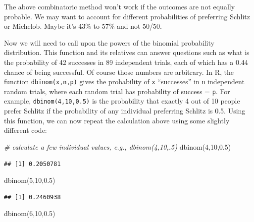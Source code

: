 \documentclass[
  openany]{book}
\newenvironment{Shaded}{\begin{snugshade}}{\end{snugshade}}
\newcommand{\CommentTok}[1]{\textcolor[rgb]{0.56,0.35,0.01}{\textit{#1}}}
\newcommand{\DecValTok}[1]{\textcolor[rgb]{0.00,0.00,0.81}{#1}}
\newcommand{\FloatTok}[1]{\textcolor[rgb]{0.00,0.00,0.81}{#1}}
\newcommand{\FunctionTok}[1]{\textcolor[rgb]{0.00,0.00,0.00}{#1}}
\newcommand{\NormalTok}[1]{#1}
\begin{document}
The above combinatoric method won't work if the outcomes are not equally probable. We may want to account for different probabilities of preferring Schlitz or Michelob. Maybe it's 43\% to 57\% and not 50/50.

Now we will need to call upon the powers of the binomial probability distribution. This function and its relatives can answer questions such as what is the probability of 42 successes in 89 independent trials, each of which has a 0.44 chance of being successful. Of course those numbers are arbitrary. In R, the function \texttt{dbinom(x,n,p)} gives the probability of \texttt{x} ``successes'' in \texttt{n} independent random trials, where each random trial has probability of success = \texttt{p}. For example, \texttt{dbinom(4,10,0.5)} is the probability that exactly 4 out of 10 people prefer Schlitz if the probability of any individual preferring Schlitz is 0.5. Using this function, we can now repeat the calculation above using some slightly different code:

\begin{Shaded}
\begin{Highlighting}[]
\CommentTok{\# calculate a few individual values, e.g., dbinom(4,10,.5)}
\FunctionTok{dbinom}\NormalTok{(}\DecValTok{4}\NormalTok{,}\DecValTok{10}\NormalTok{,}\FloatTok{0.5}\NormalTok{)}
\end{Highlighting}
\end{Shaded}

\begin{verbatim}
## [1] 0.2050781
\end{verbatim}

\begin{Shaded}
\begin{Highlighting}[]
\FunctionTok{dbinom}\NormalTok{(}\DecValTok{5}\NormalTok{,}\DecValTok{10}\NormalTok{,}\FloatTok{0.5}\NormalTok{)}
\end{Highlighting}
\end{Shaded}

\begin{verbatim}
## [1] 0.2460938
\end{verbatim}

\begin{Shaded}
\begin{Highlighting}[]
\FunctionTok{dbinom}\NormalTok{(}\DecValTok{6}\NormalTok{,}\DecValTok{10}\NormalTok{,}\FloatTok{0.5}\NormalTok{)}
\end{Highlighting}
\end{Shaded}
\end{document}
